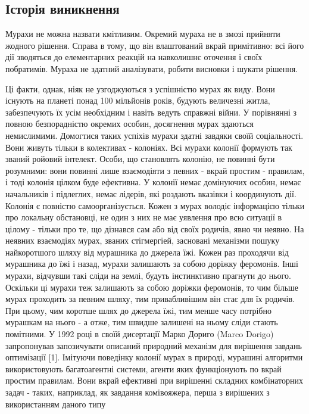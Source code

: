 \documentclass[a4paper, 12pt]{article}
\numberwithin{equation}{section}
\begin{document}
\subsection{Історія виникнення}

Мурахи не можна назвати кмітливим. Окремий мураха не в змозі прийняти жодного рішення. Справа в тому, що він влаштований вкрай примітивно: всі його дії зводяться до елементарних реакцій на навколишнє оточення і своїх побратимів. Мураха не здатний аналізувати, робити висновки і шукати рішення.

Ці факти, однак, ніяк не узгоджуються з успішністю мурах як виду. Вони існують на планеті понад 100 мільйонів років, будують величезні житла, забезпечують їх усім необхідним і навіть ведуть справжні війни. У порівнянні з повною безпорадністю окремих особин, досягнення мурах здаються немислимими.
Домогтися таких успіхів мурахи здатні завдяки своїй соціальності. Вони живуть тільки в колективах - колоніях. Всі мурахи колонії формують так званий ройовий інтелект. Особи, що становлять колонію, не повинні бути розумними: вони повинні лише взаємодіяти з певних - вкрай простим - правилам, і тоді колонія цілком буде ефективна.
У колонії немає домінуючих особин, немає начальників і підлеглих, немає лідерів, які роздають вказівки і координують дії. Колонія є повністю самоорганізується. Кожен з мурах володіє інформацією тільки про локальну обстановці, не один з них не має уявлення про всю ситуації в цілому - тільки про те, що дізнався сам або від своїх родичів, явно чи неявно. На неявних взаємодіях мурах, званих стігмергіей, засновані механізми пошуку найкоротшого шляху від мурашника до джерела їжі.
Кожен раз проходячи від мурашника до їжі і назад, мурахи залишають за собою доріжку феромонів. Інші мурахи, відчувши такі сліди на землі, будуть інстинктивно прагнути до нього. Оскільки ці мурахи теж залишають за собою доріжки феромонів, то чим більше мурах проходить за певним шляху, тим привабливішим він стає для їх родичів. При цьому, чим коротше шлях до джерела їжі, тим менше часу потрібно мурашкам на нього - а отже, тим швидше залишені на ньому сліди стають помітними.
У 1992 році в своїй дисертації Марко Дориго (Marco Dorigo) запропонував запозичувати описаний природний механізм для вирішення завдань оптимізації [1]. Імітуючи поведінку колонії мурах в природі, мурашині алгоритми використовують багатоагентні системи, агенти яких функціонують по вкрай простим правилам. Вони вкрай ефективні при вирішенні складних комбінаторних задач - таких, наприклад, як завдання комівояжера, перша з вирішених з використанням даного типу 
\end{document}
